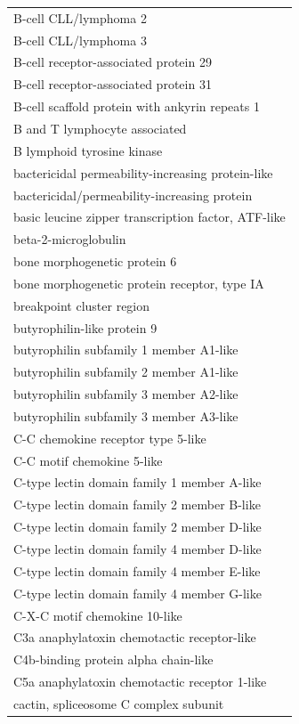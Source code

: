 \documentclass[english]{article}\usepackage[]{graphicx}\usepackage[]{color}
\begin{document}
\begin{longtable}{l}
B-cell CLL/lymphoma 2 \\ 
B-cell CLL/lymphoma 3 \\ 
B-cell receptor-associated protein 29 \\ 
B-cell receptor-associated protein 31 \\ 
B-cell scaffold protein with ankyrin repeats 1 \\ 
B and T lymphocyte associated \\ 
B lymphoid tyrosine kinase \\ 
bactericidal permeability-increasing protein-like \\ 
bactericidal/permeability-increasing protein \\ 
basic leucine zipper transcription factor, ATF-like \\ 
beta-2-microglobulin \\ 
bone morphogenetic protein 6 \\ 
bone morphogenetic protein receptor, type IA \\ 
breakpoint cluster region \\ 
butyrophilin-like protein 9 \\ 
butyrophilin subfamily 1 member A1-like \\ 
butyrophilin subfamily 2 member A1-like \\ 
butyrophilin subfamily 3 member A2-like \\ 
butyrophilin subfamily 3 member A3-like \\ 
C-C chemokine receptor type 5-like \\ 
C-C motif chemokine 5-like \\ 
C-type lectin domain family 1 member A-like \\ 
C-type lectin domain family 2 member B-like \\ 
C-type lectin domain family 2 member D-like \\ 
C-type lectin domain family 4 member D-like \\ 
C-type lectin domain family 4 member E-like \\ 
C-type lectin domain family 4 member G-like \\ 
C-X-C motif chemokine 10-like \\ 
C3a anaphylatoxin chemotactic receptor-like \\ 
C4b-binding protein alpha chain-like \\ 
C5a anaphylatoxin chemotactic receptor 1-like \\ 
cactin, spliceosome C complex subunit \\ 

\end{longtable}
\end{document}
